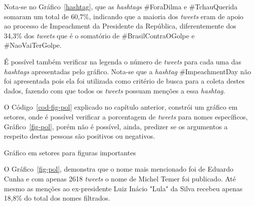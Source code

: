 Nota-se no Gráfico~\ref{hashtag}, que as \textit{hashtags} \#ForaDilma e \#TchauQuerida somaram um total de 60,7\%, indicando que a maioria dos \textit{tweets} eram de apoio ao processo de Impeachment da Presidente da República, diferentemente dos 34,3\% dos \textit{tweets} que é o somatório de \#BrasilContraOGolpe e \#NaoVaiTerGolpe.

É possível também verificar na legenda o número de \textit{tweets} para cada uma das \textit{hashtags} apresentadas pelo gráfico. Nota-se que a \textit{hashtag} \#ImpeachmentDay não foi apresentada pois ela foi utilizada como critério de busca para a coleta destes dados, fazendo com que todos os \textit{tweets} possuam menções a essa \textit{hashtag}.

O Código~\ref{cod-fig-pol} explicado no capítulo anterior, constrói um gráfico em setores, onde é possível verificar a porcentagem de \textit{tweets} para nomes específicos, Gráfico~\ref{fig-pol}, porém não é possível, ainda, predizer se os argumentos a respeito destas pessoas são positivos ou negativos.

\begin{grafico}[h]
	\centering
	\vspace{-0.2cm}
	\caption{Gráfico em setores para figuras importantes}
	\label{fig-pol}
\end{grafico}

O Gráfico~\ref{fig-pol}, demonstra que o nome mais mencionado foi de Eduardo Cunha e com apenas 2618 \textit{tweets} o nome de Michel Temer foi publicado. Até mesmo as menções ao ex-presidente Luiz Inácio "Lula" \space da Silva recebeu apenas 18,8\% do total dos nomes filtrados.

